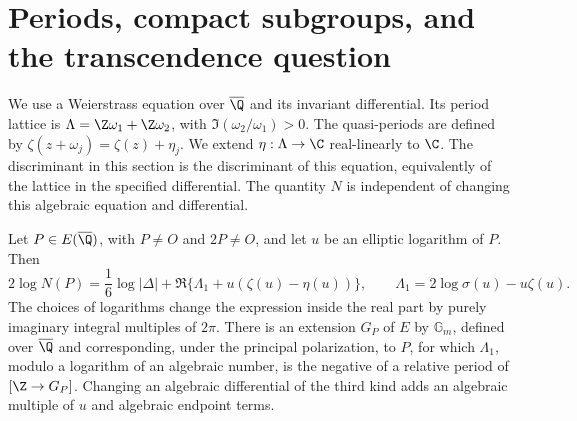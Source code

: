 \section{Periods, compact subgroups, and the transcendence question}

We use a Weierstrass equation over $\overline\Q$ and its invariant
differential. Its period lattice is $\Lambda=\Z\omega_1+\Z\omega_2$,
with $\Im(\omega_2/\omega_1)>0$. The quasi-periods are defined by
$\zeta(z+\omega_j)=\zeta(z)+\eta_j$. We extend
$\eta:\Lambda\to\C$ real-linearly to $\C$. The discriminant in
this section is the discriminant of this equation, equivalently of
the lattice in the specified differential. The quantity $N$ is
independent of changing this algebraic equation and differential.

\begin{proposition}\label{ari:C.7.1}
Let $P\in E(\overline\Q)$, with $P\ne O$ and $2P\ne O$, and
let $u$ be an elliptic logarithm of $P$. Then
\begin{equation}\label{ari:eq:cp-sigma}
 2\log N(P)=\frac16\log|\Delta|
       +\Re\{\Lambda_1+u(\zeta(u)-\eta(u))\},
 \qquad \Lambda_1=2\log\sigma(u)-u\zeta(u).
\end{equation}
The choices of logarithms change the expression inside the real
part by purely imaginary integral multiples of $2\pi$.
There is an extension $G_P$ of $E$ by $\mathbb G_m$, defined
over $\overline\Q$ and corresponding, under the principal
polarization, to $P$, for which $\Lambda_1$, modulo a logarithm
of an algebraic number, is the negative of a relative period
of $[\Z\to G_P]$. Changing an algebraic differential of the
third kind adds an algebraic multiple of $u$ and algebraic
endpoint terms.
\end{proposition}

